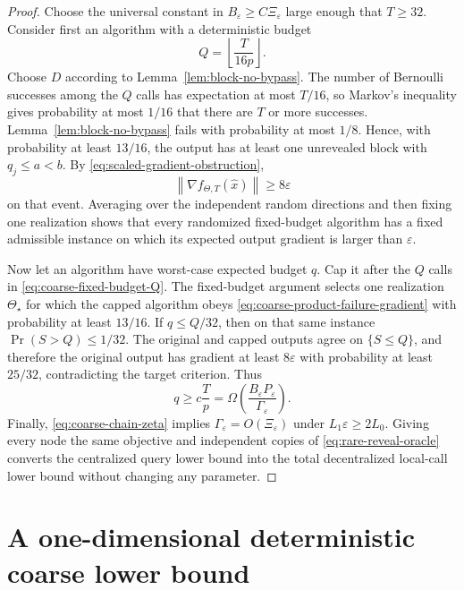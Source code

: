 \documentclass[11pt,a4paper]{article}
\newcommand{\eps}{\varepsilon}
\newcommand{\norm}[1]{\left\lVert #1\right\rVert}
\theoremstyle{remark}
\begin{document}
\begin{proof}
Choose the universal constant in $B_\eps\ge C\Xi_\eps$ large enough
that $T\ge32$. Consider first an algorithm with a deterministic budget
\begin{equation}
 Q=\left\lfloor\frac{T}{16p}\right\rfloor.
 \label{eq:coarse-fixed-budget-Q}
\end{equation}
Choose $D$ according to Lemma~\ref{lem:block-no-bypass}.  The number of
Bernoulli successes among the $Q$ calls has expectation at most $T/16$, so
Markov's inequality gives probability at most $1/16$ that there are $T$ or
more successes.  Lemma~\ref{lem:block-no-bypass} fails with probability at
most $1/8$.  Hence, with probability at least $13/16$, the output has at
least one unrevealed block with $q_j\le a<b$.  By
\eqref{eq:scaled-gradient-obstruction},
\begin{equation}
 \norm{\nabla f_{\Theta,T}(\widehat x)}\ge8\eps
 \label{eq:coarse-product-failure-gradient}
\end{equation}
on that event.  Averaging over the independent random directions and then
fixing one realization shows that every randomized fixed-budget algorithm
has a fixed admissible instance on which its expected output gradient is
larger than $\eps$.

Now let an algorithm have worst-case expected budget $q$.  Cap it after the
$Q$ calls in \eqref{eq:coarse-fixed-budget-Q}.  The fixed-budget argument
selects one realization $\Theta_\star$ for which the capped algorithm obeys
\eqref{eq:coarse-product-failure-gradient} with probability at least
$13/16$.  If $q\le Q/32$, then on that same instance
$\Pr(S>Q)\le1/32$.  The original and capped outputs agree on
$\{S\le Q\}$, and therefore the original output has gradient at least
$8\eps$ with probability at least $25/32$, contradicting the target
criterion.  Thus
\[
 q\ge c\frac{T}{p}
 =\Omega\left(\frac{B_\eps P_\eps}{\Gamma_\eps}\right).
\]
Finally, \eqref{eq:coarse-chain-zeta} implies
$\Gamma_\eps=O(\Xi_\eps)$ under
$L_1\eps\ge2L_0$.  Giving every node the same objective and independent
copies of \eqref{eq:rare-reveal-oracle} converts the centralized query lower
bound into the total decentralized local-call lower bound without changing
any parameter.
\end{proof}

\section{A one-dimensional deterministic coarse lower bound}
\label{sec:coarse-reset}
\end{document}
